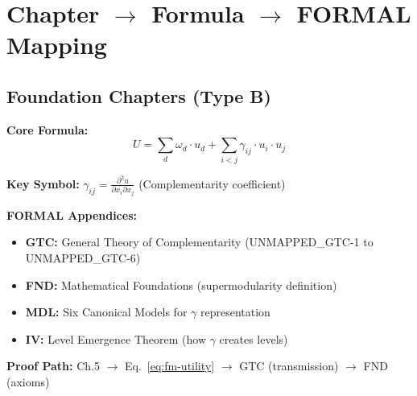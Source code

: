 \section{Chapter $\rightarrow$ Formula $\rightarrow$ FORMAL Mapping}
\label{sec:fm-mapping}

\subsection{Foundation Chapters (Type B)}

\begin{tcolorbox}[colback=gray!3!white, colframe=gray!60!black,
    title=\textbf{Chapter 5: Complementarity (HOW)}]

\textbf{Core Formula:}
\begin{equation}
U = \sum_{d} \omega_d \cdot u_d + \sum_{i < j} \gamma_{ij} \cdot u_i \cdot u_j
\label{eq:fm-utility}
\end{equation}

\textbf{Key Symbol:} $\gamma_{ij} = \frac{\partial^2 u}{\partial x_i \partial x_j}$ (Complementarity coefficient)

\textbf{FORMAL Appendices:}
\begin{itemize}[nosep]
    \item \textbf{GTC:} General Theory of Complementarity (UNMAPPED_GTC-1 to UNMAPPED_GTC-6)
    \item \textbf{FND:} Mathematical Foundations (supermodularity definition)
    \item \textbf{MDL:} Six Canonical Models for $\gamma$ representation
    \item \textbf{IV:} Level Emergence Theorem (how $\gamma$ creates levels)
\end{itemize}

\textbf{Proof Path:} Ch.5 $\rightarrow$ Eq.~\ref{eq:fm-utility} $\rightarrow$ GTC (transmission) $\rightarrow$ FND (axioms)

\end{tcolorbox}

